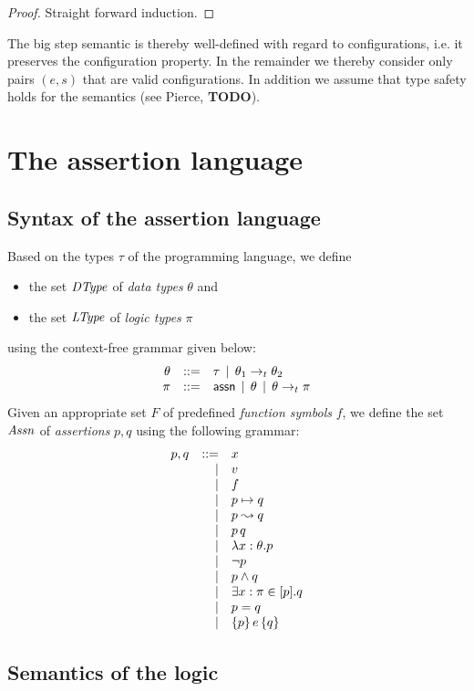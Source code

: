 \documentclass[12pt,a4paper]{report}
\begin{document}
\begin{proof}
  Straight forward induction.
\end{proof}

The big step semantic is thereby well-defined with regard to configurations, i.e. it preserves
the configuration property. In the remainder
we thereby consider only pairs $(e,s)$ that are valid configurations. In addition we
assume that type safety holds for the semantics (see Pierce, {\bf TODO}).



\chapter{The assertion language}



\section{Syntax of the assertion language}

Based on the types $\tau$ of the programming language, we define
\begin{itemize}
  \item the set $\mathit{DType}$ of {\em data types} $\theta$ and
  \item the set $\mathit{LType}$ of {\em logic types} $\pi$
\end{itemize}
using the context-free grammar given below:
\[\begin{array}{rrlll}
  \theta & ::= & \tau \,\mid\, \theta_1\rightarrow_t\theta_2 \\
  \pi & ::= & \mathsf{assn} \,\mid\, \theta \,\mid\, \theta\rightarrow_t\pi
\end{array}\]
Given an appropriate set $F$ of predefined {\em function symbols} $f$, we
define the set $\mathit{Assn}$ of {\em assertions} $p,q$ using the following grammar:
\[\begin{array}{rrlll}
  p,q & ::= & x
      \\ & \mid & v
      \\ & \mid & f
      \\ & \mid & p \mapsto q
      \\ & \mid & p \leadsto q
      \\ & \mid & p\,q
      \\ & \mid & \lambda x:\theta.p
      \\ & \mid & \neg p
      \\ & \mid & p \wedge q
      \\ & \mid & \exists x:\pi \in [p]. q
      \\ & \mid & p = q
      \\ & \mid & \{p\}\,e\,\{q\}
\end{array}\]



\section{Semantics of the logic}


\end{document}
